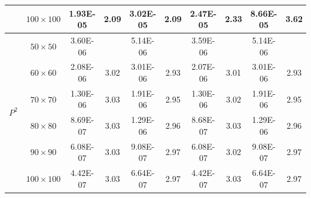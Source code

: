 \documentclass{book}
\begin{document}
\begin{table}[ht]
\begin{tabular}{|c|c|cccc|cccc|}
                               & $100\times 100$ & \multicolumn{1}{c|}{1.93E-05}                 & \multicolumn{1}{c|}{2.09}                      & \multicolumn{1}{c|}{3.02E-05}         & 2.09  & \multicolumn{1}{c|}{2.47E-05}    & \multicolumn{1}{c|}{2.33}  & \multicolumn{1}{c|}{8.66E-05}         & 3.62  \\ \hline
        \multirow{6}{*}{$P^2$} & $50\times 50$   & \multicolumn{1}{c|}{3.60E-06}                 & \multicolumn{1}{c|}{}                          & \multicolumn{1}{c|}{5.14E-06}         &       & \multicolumn{1}{c|}{3.59E-06}    & \multicolumn{1}{c|}{}      & \multicolumn{1}{c|}{5.14E-06}         &       \\ \cline{2-10}
                               & $60\times 60$   & \multicolumn{1}{c|}{2.08E-06}                 & \multicolumn{1}{c|}{3.02}                      & \multicolumn{1}{c|}{3.01E-06}         & 2.93  & \multicolumn{1}{c|}{2.07E-06}    & \multicolumn{1}{c|}{3.01}  & \multicolumn{1}{c|}{3.01E-06}         & 2.93  \\ \cline{2-10}
                               & $70\times 70$   & \multicolumn{1}{c|}{1.30E-06}                 & \multicolumn{1}{c|}{3.03}                      & \multicolumn{1}{c|}{1.91E-06}         & 2.95  & \multicolumn{1}{c|}{1.30E-06}    & \multicolumn{1}{c|}{3.02}  & \multicolumn{1}{c|}{1.91E-06}         & 2.95  \\ \cline{2-10}
                               & $80\times 80$   & \multicolumn{1}{c|}{8.69E-07}                 & \multicolumn{1}{c|}{3.03}                      & \multicolumn{1}{c|}{1.29E-06}         & 2.96  & \multicolumn{1}{c|}{8.68E-07}    & \multicolumn{1}{c|}{3.03}  & \multicolumn{1}{c|}{1.29E-06}         & 2.96  \\ \cline{2-10}
                               & $90\times 90$   & \multicolumn{1}{c|}{6.08E-07}                 & \multicolumn{1}{c|}{3.03}                      & \multicolumn{1}{c|}{9.08E-07}         & 2.97  & \multicolumn{1}{c|}{6.08E-07}    & \multicolumn{1}{c|}{3.02}  & \multicolumn{1}{c|}{9.08E-07}         & 2.97  \\ \cline{2-10}
                               & $100\times 100$ & \multicolumn{1}{c|}{4.42E-07}                 & \multicolumn{1}{c|}{3.03}                      & \multicolumn{1}{c|}{6.64E-07}         & 2.97  & \multicolumn{1}{c|}{4.42E-07}    & \multicolumn{1}{c|}{3.03}  & \multicolumn{1}{c|}{6.64E-07}         & 2.97  \\ \hline
    \end{tabular}
\end{table}
\end{document}
